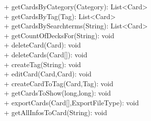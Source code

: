 { 
    + getCardsByCategory(Category): List<Card> \\ 
    + getCardsByTag(Tag): List<Card> \\ 
    + getCardsBySearchterms(String): List<Card> \\ 
    + getCountOfDecksFor(String): void\\
    + deleteCard(Card): void \\
    + deleteCards(Card[]): void\\
    + createTag(String): void\\
    + editCard(Card,Card): void\\
    + createCardToTag(Card,Tag): void\\
    + getCardsToShow(long,long): void\\
    + exportCards(Card[],ExportFileType): void\\
    + getAllInfosToCard(String): void\\
}{}